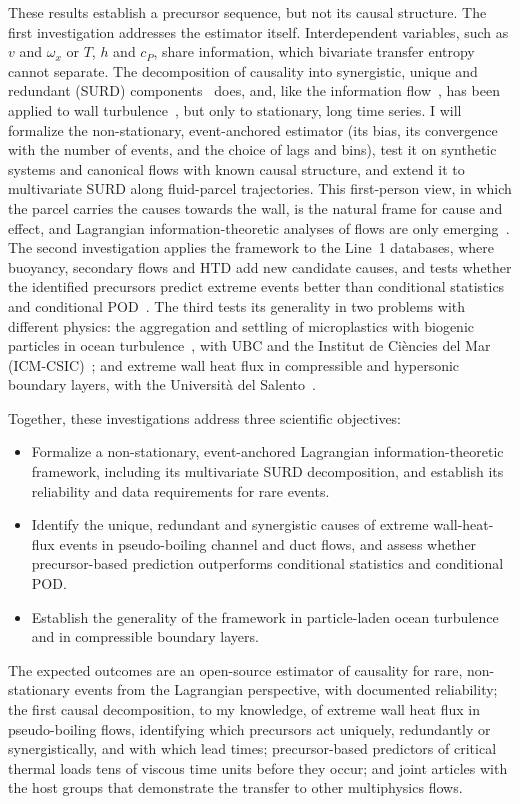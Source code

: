 \documentclass[11pt]{article}
\begin{document}
These results establish a precursor sequence, but not its causal structure. The first
investigation addresses the estimator itself. Interdependent variables, such as $v$ and
$\omega_x$ or $T$, $h$ and $c_P$, share information, which bivariate transfer entropy cannot
separate. The decomposition of causality into synergistic, unique and redundant (SURD)
components~\cite{MartinezSanchez2024} does, and, like the information flow~\cite{Liang2005}, has been
applied to wall turbulence~\cite{LozanoDuran2020,Massaro2023,Zhang2026}, but only to stationary,
long time series. I will formalize the non-stationary, event-anchored estimator (its bias, its
convergence with the number of events, and the choice of lags and bins), test it on synthetic
systems and canonical flows with known causal structure, and extend it to multivariate SURD along
fluid-parcel trajectories. This first-person view, in which the parcel carries the causes towards
the wall, is the natural frame for cause and effect, and Lagrangian information-theoretic analyses
of flows are only emerging~\cite{Jiang2027}. The second investigation applies the framework to the
Line~1 databases, where buoyancy, secondary flows and HTD add new candidate causes, and tests
whether the identified precursors predict extreme events better than conditional statistics and
conditional POD~\cite{Martin2025}. The third tests its generality in two problems with different
physics: the aggregation and settling of microplastics with biogenic particles in ocean
turbulence~\cite{Rahmani2022,Pizzi2024,Pizzi2026}, with UBC and the Institut de Ci\`encies del Mar
(ICM-CSIC)~\cite{Pizzi2025}; and extreme wall heat flux in compressible and hypersonic boundary
layers, with the Universit\`a del Salento~\cite{DiRenzoUrzay2021,Passiatore2022}.

Together, these investigations address three scientific objectives:
\begin{itemize}
  \item[\textbf{O4.}] Formalize a non-stationary, event-anchored Lagrangian information-theoretic
  framework, including its multivariate SURD decomposition, and establish its reliability and data
  requirements for rare events.
  \item[\textbf{O5.}] Identify the unique, redundant and synergistic causes of extreme
  wall-heat-flux events in pseudo-boiling channel and duct flows, and assess whether
  precursor-based prediction outperforms conditional statistics and conditional POD.
  \item[\textbf{O6.}] Establish the generality of the framework in particle-laden ocean turbulence
  and in compressible boundary layers.
\end{itemize}
The expected outcomes are an open-source estimator of causality for rare, non-stationary events
from the Lagrangian perspective, with documented reliability; the first causal decomposition, to
my knowledge, of extreme wall heat flux in pseudo-boiling flows, identifying which precursors act
uniquely, redundantly or synergistically, and with which lead times; precursor-based predictors of
critical thermal loads tens of viscous time units before they occur; and joint articles with the
host groups that demonstrate the transfer to other multiphysics flows.
\end{document}
